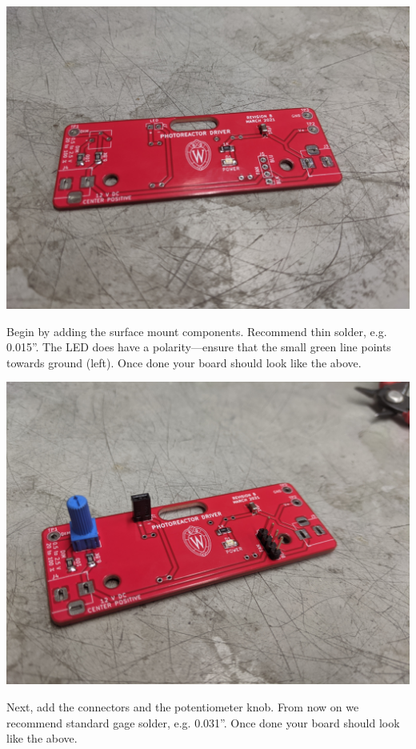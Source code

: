 \documentclass[11pt]{article}
\begin{document}
\begin{center}
  \includegraphics[width=\textwidth/2]{"./surface-mount.jpg"}
\end{center}

Begin by adding the surface mount components.
Recommend thin solder, e.g. 0.015''.
The LED does have a polarity---ensure that the small green line points towards ground (left).
Once done your board should look like the above.

\begin{center}
  \includegraphics[width=\textwidth/2]{"./connectors.jpg"}
\end{center}

Next, add the connectors and the potentiometer knob.
From now on we recommend standard gage solder, e.g. 0.031''.
Once done your board should look like the above.
\end{document}
